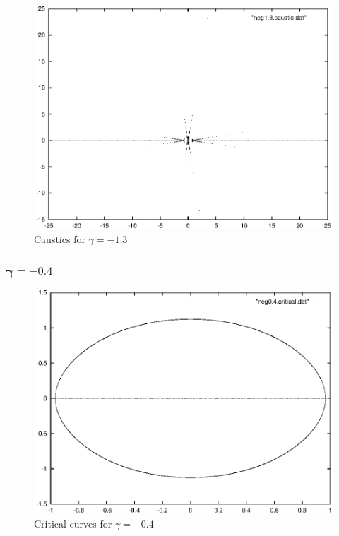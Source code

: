 \documentclass[a4paper]{IEEEtran}
\begin{document}
    \begin{figure}
        \caption{Caustics for $\gamma = -1.3$} 
        \label{fig:caustics-gamma-1-3}
        \begin{center}
            \includegraphics[width=\columnwidth]{images/neg1-3-caustic.eps} 
        \end{center}
    \end{figure}

    \subsubsection{$\mathbf{\gamma = -0.4}$}
    \begin{figure}
        \caption{Critical curves for $\gamma = -0.4$}
        \label{fig:critical-gamma-0-4}   
        \begin{center}
            \includegraphics[width=\columnwidth]{images/neg0-4-critical.eps} 
        \end{center}
    \end{figure} 
\end{document}
